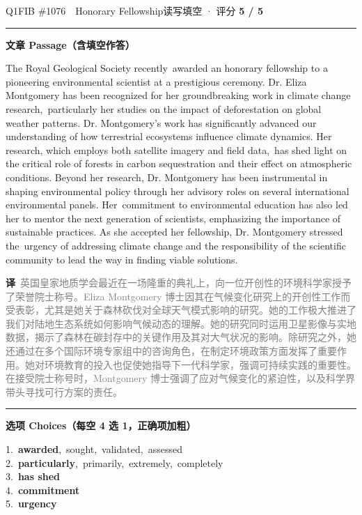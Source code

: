 \documentclass[11pt]{article}
\newcommand{\ptesub}[1]{%
  \par\needspace{2\baselineskip}\smallskip
  {\color{cAccent}\rule[-0.2ex]{3pt}{1.05em}}\hspace{6pt}%
  {\bfseries\color{cHead}#1}\par\nopagebreak\smallskip}
\newcommand{\zh}[1]{{\footnotesize\textcolor{cNote}{\textbf{译}}\ \textcolor{gray}{#1}}}
\newcommand{\rok}[1]{{\color{cFix}\ding{51}\,#1}}                 %
\begin{document}
\begin{qblock}{Q1\quad FIB \#1076\ \ Honorary Fellowship}{读写填空 · 评分 \textcolor{cAccent}{\bfseries 5 / 5}}
\ptesub{文章 Passage（含填空作答）}
\begin{promptbox}
The Royal Geological Society recently \rok{awarded} an honorary fellowship to a pioneering environmental scientist at a prestigious ceremony. Dr. Eliza Montgomery has been recognized for her groundbreaking work in climate change research, \rok{particularly} her studies on the impact of deforestation on global weather patterns. Dr. Montgomery's work has significantly advanced our understanding of how terrestrial ecosystems influence climate dynamics. Her research, which employs both satellite imagery and field data, \rok{has shed} light on the critical role of forests in carbon sequestration and their effect on atmospheric conditions. Beyond her research, Dr. Montgomery has been instrumental in shaping environmental policy through her advisory roles on several international environmental panels. Her \rok{commitment} to environmental education has also led her to mentor the next generation of scientists, emphasizing the importance of sustainable practices. As she accepted her fellowship, Dr. Montgomery stressed the \rok{urgency} of addressing climate change and the responsibility of the scientific community to lead the way in finding viable solutions.
\end{promptbox}
\zh{英国皇家地质学会最近在一场隆重的典礼上，向一位开创性的环境科学家授予了荣誉院士称号。Eliza Montgomery 博士因其在气候变化研究上的开创性工作而受表彰，尤其是她关于森林砍伐对全球天气模式影响的研究。她的工作极大推进了我们对陆地生态系统如何影响气候动态的理解。她的研究同时运用卫星影像与实地数据，揭示了森林在碳封存中的关键作用及其对大气状况的影响。除研究之外，她还通过在多个国际环境专家组中的咨询角色，在制定环境政策方面发挥了重要作用。她对环境教育的投入也促使她指导下一代科学家，强调可持续实践的重要性。在接受院士称号时，Montgomery 博士强调了应对气候变化的紧迫性，以及科学界带头寻找可行方案的责任。}
\ptesub{选项 Choices（每空 4 选 1，正确项加粗）}
{\small
1.\ \textbf{awarded},\ sought,\ validated,\ assessed\\
2.\ \textbf{particularly},\ primarily,\ extremely,\ completely\\
3.\ \textbf{has shed}\\
4.\ \textbf{commitment}\\
5.\ \textbf{urgency}}

\end{qblock}
\end{document}
